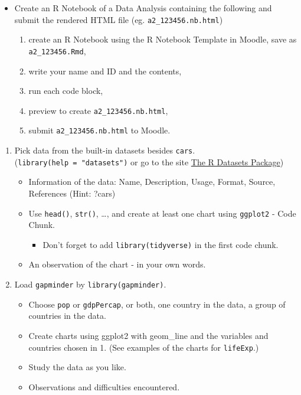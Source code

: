 \documentclass[
  xelatex, ja=standard]{bxjsbook}
\providecommand{\tightlist}{%
  \setlength{\itemsep}{0pt}\setlength{\parskip}{0pt}}
\theoremstyle{definition}
\theoremstyle{definition}
\theoremstyle{definition}
\theoremstyle{definition}
\theoremstyle{remark}
\begin{document}
\begin{itemize}
\tightlist
\item
  Create an R Notebook of a Data Analysis containing the following and submit the rendered HTML file (eg. \texttt{a2\_123456.nb.html})

  \begin{enumerate}
  \def\labelenumi{\arabic{enumi}.}
  \tightlist
  \item
    create an R Notebook using the R Notebook Template in Moodle, save as \texttt{a2\_123456.Rmd},
  \item
    write your name and ID and the contents,
  \item
    run each code block,
  \item
    preview to create \texttt{a2\_123456.nb.html},
  \item
    submit \texttt{a2\_123456.nb.html} to Moodle.
  \end{enumerate}
\end{itemize}

\begin{enumerate}
\def\labelenumi{\arabic{enumi}.}
\item
  Pick data from the built-in datasets besides \texttt{cars}. (\texttt{library(help\ =\ "datasets")} or go to the site \href{https://stat.ethz.ch/R-manual/R-devel/library/datasets/html/00Index.html}{The R Datasets Package})

  \begin{itemize}
  \tightlist
  \item
    Information of the data: Name, Description, Usage, Format, Source, References (Hint: ?cars)
  \item
    Use \texttt{head()}, \texttt{str()}, \ldots, and create at least one chart using \texttt{ggplot2} - Code Chunk.

    \begin{itemize}
    \tightlist
    \item
      Don't forget to add \texttt{library(tidyverse)} in the first code chunk.
    \end{itemize}
  \item
    An observation of the chart - in your own words.
  \end{itemize}
\item
  Load \texttt{gapminder} by \texttt{library(gapminder)}.

  \begin{itemize}
  \tightlist
  \item
    Choose \texttt{pop} or \texttt{gdpPercap}, or both, one country in the data, a group of countries in the data.
  \item
    Create charts using ggplot2 with geom\_line and the variables and countries chosen in 1. (See examples of the charts for \texttt{lifeExp}.)
  \item
    Study the data as you like.
  \item
    Observations and difficulties encountered.
  \end{itemize}
\end{enumerate}
\end{document}
